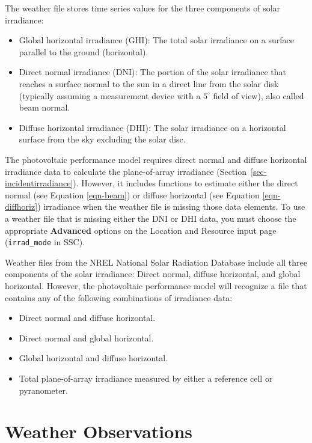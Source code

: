 \documentclass[12pt,letterpaper]{article}
\begin{document}
The weather file stores time series values for the three components of solar irradiance:

\begin{itemize}
\item Global horizontal irradiance (GHI): The total solar irradiance on a surface parallel to the ground (horizontal).
\item Direct normal irradiance (DNI): The portion of the solar irradiance that reaches a surface normal to the sun in a direct line from the solar disk (typically assuming a measurement device with a $5^{\circ}$ field of view), also called beam normal.
\item Diffuse horizontal irradiance (DHI): The solar irradiance on a horizontal surface from the sky excluding the solar disc.
\end{itemize}

The photovoltaic performance model requires direct normal and diffuse horizontal irradiance data to calculate the plane-of-array irradiance (Section~\ref{sec-incidentirradiance}). However, it includes functions to estimate either the direct normal (see Equation \ref{eqn-beam}) or diffuse horizontal (see Equation \ref{eqn-diffhoriz}) irradiance when the weather file is missing those data elements. To use a weather file that is missing either the DNI or DHI data, you must choose the appropriate \textbf{Advanced} options on the Location and Resource input page (\texttt{irrad\_mode} in SSC).

Weather files from the NREL National Solar Radiation Database include all three components of the solar irradiance: Direct normal, diffuse horizontal, and global horizontal. However, the photovoltaic performance model will recognize a file that contains any of the following combinations of irradiance data:

\begin{itemize}
\item Direct normal and diffuse horizontal.
\item Direct normal and global horizontal.
\item Global horizontal and diffuse horizontal.
\item Total plane-of-array irradiance measured by either a reference cell or pyranometer.
\end{itemize}

\section{Weather Observations}
\end{document}
